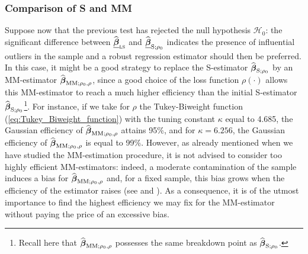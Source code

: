 \subsubsection{Comparison of S and MM}

Suppose now that the previous test has rejected the null hypothesis
$\mathcal{H}_{0}$: the significant difference between $\sthat{\underline
{\boldsymbol\beta}}_{\stsc{LS}}$ and $\widehat{\underline
{\boldsymbol\beta}}_{\mathrm{S};\rho_{0}}$ indicates the presence of
influential outliers in the sample and a robust regression estimator should
then be preferred. In this case, it might be a good strategy to replace the
S-estimator $\widehat{\boldsymbol\beta}_{\mathrm{S};\rho_{0}}$ by an
MM-estimator $\widehat{\boldsymbol\beta}_{\mathrm{MM};\rho_{0},\rho}$, since
a good choice of the loss function $\rho\left(  \cdot\right)  $ allows this
MM-estimator to reach a much higher efficiency than the initial S-estimator
$\widehat{\boldsymbol\beta}_{\mathrm{S};\rho_{0}}$\footnote{Recall here that
$\widehat{\boldsymbol\beta}_{\mathrm{MM};\rho_{0},\rho}$ possesses the same
breakdown point as $\widehat{\boldsymbol\beta}_{\mathrm{S};\rho_{0}}$.}. For
instance, if we take for $\rho$ the Tukey-Biweight function
(\ref{eq:Tukey_Biweight_function}) with the tuning constant $\kappa$ equal to
4.685, the Gaussian efficiency of $\sthat{\boldsymbol\beta}_{\mathrm{MM}%
;\rho_{0},\rho}$ attains 95\%, and for $\kappa=6.256$, the Gaussian efficiency
of $\widehat{\boldsymbol\beta}_{\mathrm{MM};\rho_{0},\rho}$ is equal to
99\%. However, as already mentioned when we have studied the MM-estimation
procedure, it is not advised to consider too highly efficient MM-estimators:
indeed, a moderate contamination of the sample induces a bias for
$\widehat{\boldsymbol\beta}_{\mathrm{MM};\rho_{0},\rho}$ and, for a fixed
sample, this bias grows when the efficiency of the estimator raises (see
\citealp{maronna:etal:2006} and \citealp{Omelka:2010}).
As a consequence, it is of the utmost importance to find the highest
efficiency we may fix for the MM-estimator without paying the price of an
excessive bias.

